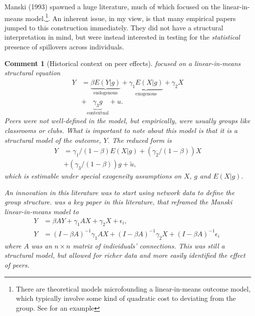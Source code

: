 \documentclass{tufte-handout}
\theoremstyle{break}
\newtheorem{cmt}{Comment}
\begin{document}
Manski (1993) spawned a huge literature, much of which  focused on the linear-in-means model.\footnote{There are theoretical models microfounding a linear-in-means outcome model, which typically involve some kind of quadratic cost to deviating from the group. See \citet{shue2013executive} for an example}. An inherent issue, in my view, is that many empirical papers
jumped to this construction immediately. They did not have a structural interpretation in mind, but were instead interested in testing for the \emph{statistical} presence of spillovers across individuals. 

\begin{boxF}
  \begin{cmt}[Historical context on peer effects]
    \citet{manski1993identification} focused on a linear-in-means structural equation
  \begin{align*}
    Y &= \underbrace{\beta E(Y|g)}_{\text{endogenous}} + \underbrace{\gamma_{1} E(X|g)}_{\text{exogenous}} + \gamma_{2} X\\
    &+ \underbrace{\gamma_{3} g}_{\text{contextual}} + u. 
  \end{align*}
 Peers were not well-defined in the model, but empirically, were usually groups like
classrooms or clubs. What is important to note about this model is that it is a \emph{structural} model of the outcome, $Y$.  The reduced form is
\begin{align*}
  Y &=  \gamma_{1}/(1-\beta) E(X|g) + (\gamma_{2}/(1-\beta)) X\\
    &+ (\gamma_{3}/(1-\beta)) g + \tilde{u}, 
  \end{align*}
  which is estimable under special exogeneity assumptions on $X$, $g$ and $E(X|g)$. 

  \hspace{10pt} An innovation in this literature was to start using network data to define the group structure.  \citet{bramoulle2009identification} was a key paper in this literature, that reframed the Manski linear-in-means model to
  \begin{align*}
    Y &= \beta AY  + \gamma_{1} AX + \gamma_{2}X + \epsilon_{i},\; \\
    Y  &=   (I-\beta A)^{-1}\gamma_{1} AX + (I-\beta A)^{-1}\gamma_{2}X + (I-\beta A)^{-1}\epsilon_{i} \; 
  \end{align*}
where $A$ was an $n \times n$ matrix of individuals' connections. This was still a structural model, but allowed for richer data and more easily identified the effect of peers. 
\end{cmt}
\end{boxF}
\end{document}
